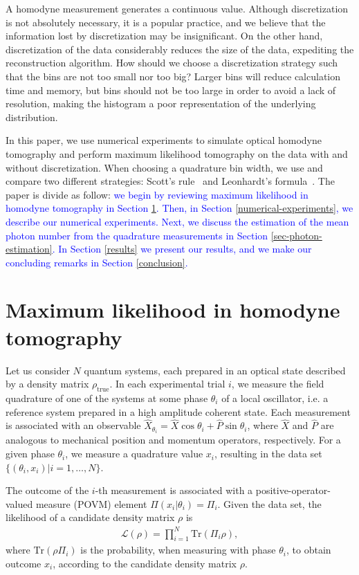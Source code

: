 \documentclass[
reprint,
superscriptaddress,
showpacs,
amsmath,
amssymb,
aps,
pra,
longbibliography
]{revtex4-1}
\providecommand{\editcolor}[2]{\textcolor{#1}{#2}}
\providecommand{\editcolor}[2]{#2}
\newcommand{\HV}[1]{\editcolor{blue}{#1}}
\newcommand{\rhotrue}{\rho_{\text{true}}}
\begin{document}
A homodyne measurement generates a continuous value. Although discretization is
  not absolutely necessary, it is a popular practice, and we believe
that the information lost by discretization may be insignificant. On the other hand,
discretization of the data considerably reduces the size of the data,
expediting the reconstruction algorithm. How should we choose a discretization
strategy such that the bins are not too small nor too big? Larger
bins will reduce calculation time and memory, but bins should not be too large 
in order to avoid a lack of resolution, making the histogram a poor 
representation of the underlying distribution.
 
In this paper, we use numerical experiments to simulate optical
homodyne tomography and perform maximum likelihood tomography on the data 
with and without discretization. When choosing a quadrature bin
width, we use and compare two different strategies:
Scott's rule~\cite{Scott2010} and Leonhardt's formula~\cite{Leonhardt1996}. 
The paper is divide as follow: \HV{we begin by reviewing maximum likelihood in homodyne tomography in Section \ref{MLE}. Then, in Section \ref{numerical-experiments}, we describe our numerical experiments. Next, we discuss the estimation of the mean photon number from the quadrature measurements in Section \ref{sec-photon-estimation}. In Section \ref{results} we present our results, and we make our concluding remarks in Section \ref{conclusion}.}

\section{Maximum likelihood in homodyne tomography}
\label{MLE}
Let us consider $N$ quantum systems, each prepared in an
optical state described by a density matrix $\rhotrue$. In each
experimental trial $i$, we measure the field quadrature
of one of the systems at some phase $\theta_i$ of a local oscillator, 
i.e. a reference system prepared in a high amplitude coherent state. 
Each measurement is associated with an observable
$\hat{X}_{\theta_i} = \hat{X} \cos \theta_i + \hat{P} \sin \theta_i$,
where $\hat{X}$ and $\hat{P}$ are analogous to mechanical position and 
momentum operators, respectively. For a given phase $\theta_i$, we 
measure a quadrature value $x_i$, resulting in the 
data set $\{(\theta_i, x_i)| i = 1, \ldots, N\}$.

The outcome of the $i$-th measurement is associated with a positive-operator-valued measure (POVM) element $\Pi (x_i|\theta_i) = \Pi_i$. Given the data set, the
likelihood of a candidate density matrix $\rho$ is
\begin{eqnarray}
  \mathcal{L} (\rho)= \prod_{i=1}^{N} \mathrm{Tr} (\Pi_i \rho),
  \label{eq-likelihood}
\end{eqnarray}
where $\mathrm{Tr}(\rho \Pi_i)$ is the probability, when measuring
with phase $\theta_i$, to obtain outcome $x_i$, according to the
candidate density matrix $\rho$.
\end{document}
